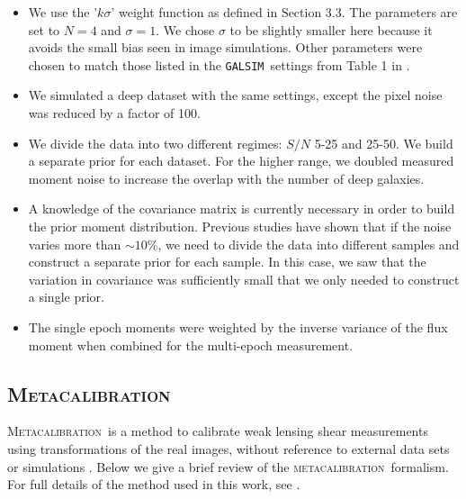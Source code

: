 \documentclass[fleqn,useAMS,usenatbib]{mnras}
\newcommand{\galsim}{\texttt{GALSIM}}
\newcommand{\mcal}{\textsc{metacalibration}}
\newcommand{\Mcal}{\textsc{Metacalibration}}
\begin{document}
\begin{itemize}
\item We use the '$k\sigma$' weight function as defined in \cite{Bernstein2016} 
Section 3.3.  The parameters are set to $N=4$ and $\sigma=1$.  We chose 
$\sigma$ to be slightly smaller here because it avoids the small bias seen in 
image simulations.  Other parameters were chosen to match those listed in the 
\galsim\ settings from Table 1 in \cite{Bernstein2016}.
\item We simulated a deep dataset with the same settings, except the pixel 
noise was reduced by a factor of 100.
\item We divide the data into two different regimes: $S/N$ 5-25 and 25-50.  We 
build a separate prior for each dataset.  For the higher range, we doubled 
measured moment noise to increase the overlap with the number of deep galaxies.
\item A knowledge of the covariance matrix is currently necessary in order to 
build the prior moment distribution.  Previous studies have shown that if the 
noise varies more than $\sim 10\%$, we need to divide the data into different 
samples and construct a separate prior for each sample.  In this case, we saw 
that the variation in covariance was sufficiently small that we only needed to 
construct a single prior.
\item The single epoch moments were weighted by the inverse variance of the 
flux moment when combined for the multi-epoch measurement.  
\end{itemize}

\subsection{\Mcal}
\label{Section:Metacal}

\Mcal\ is a method to calibrate weak lensing shear measurements using
transformations of the real images, without reference to external data sets or
simulations \citep{HuffMand2017,SheldonHuff2017}.  Below we give a brief review
of the \mcal\ formalism.  For full details of the method used in this work, see
\cite{SheldonHuff2017}.
\end{document}
